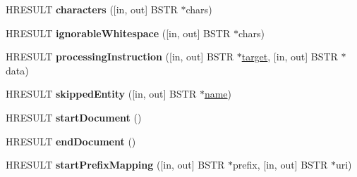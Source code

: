 \begin{DoxyCompactItemize}
\item 
\mbox{\label{interface_m_s_x_m_l2_1_1_i_v_b_s_a_x_content_handler_a90bdf5ab404e5e47679c4d766538e28e}} 
H\+R\+E\+S\+U\+LT {\bfseries characters} (\mbox{[}in, out\mbox{]} B\+S\+TR $\ast$chars)
\item 
\mbox{\label{interface_m_s_x_m_l2_1_1_i_v_b_s_a_x_content_handler_a6f772025f033461add8d1f051302e598}} 
H\+R\+E\+S\+U\+LT {\bfseries ignorable\+Whitespace} (\mbox{[}in, out\mbox{]} B\+S\+TR $\ast$chars)
\item 
\mbox{\label{interface_m_s_x_m_l2_1_1_i_v_b_s_a_x_content_handler_aa61da9f3a6b8ba5e8aaa4f928bed0111}} 
H\+R\+E\+S\+U\+LT {\bfseries processing\+Instruction} (\mbox{[}in, out\mbox{]} B\+S\+TR $\ast$\hyperlink{interfacevoid}{target}, \mbox{[}in, out\mbox{]} B\+S\+TR $\ast$data)
\item 
\mbox{\label{interface_m_s_x_m_l2_1_1_i_v_b_s_a_x_content_handler_a27fd4e49c8f5f107f282586723985d69}} 
H\+R\+E\+S\+U\+LT {\bfseries skipped\+Entity} (\mbox{[}in, out\mbox{]} B\+S\+TR $\ast$\hyperlink{structname}{name})
\item 
\mbox{\label{interface_m_s_x_m_l2_1_1_i_v_b_s_a_x_content_handler_a67db42d558655301b6a03a09e46c5174}} 
H\+R\+E\+S\+U\+LT {\bfseries start\+Document} ()
\item 
\mbox{\label{interface_m_s_x_m_l2_1_1_i_v_b_s_a_x_content_handler_a6842da9db003a4dc4baf76ac9760e700}} 
H\+R\+E\+S\+U\+LT {\bfseries end\+Document} ()
\item 
\mbox{\label{interface_m_s_x_m_l2_1_1_i_v_b_s_a_x_content_handler_affe4ce1e3b99e524f610cae1aa302a47}} 
H\+R\+E\+S\+U\+LT {\bfseries start\+Prefix\+Mapping} (\mbox{[}in, out\mbox{]} B\+S\+TR $\ast$prefix, \mbox{[}in, out\mbox{]} B\+S\+TR $\ast$uri)
\item 
\mbox{\label{interface_m_s_x_m_l2_1_1_i_v_b_s_a_x_content_handler_a53ae8b71dd21d0173cf4a5bf17ef6f2b}} 

\end{DoxyCompactItemize}
